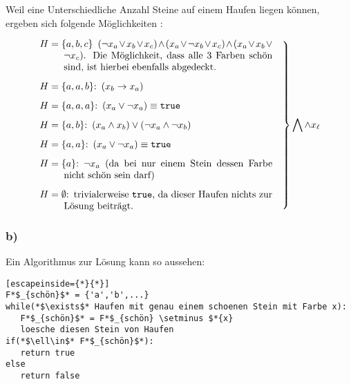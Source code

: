 \documentclass{article}
\begin{document}
Weil eine Unterschiedliche Anzahl Steine auf einem Haufen
liegen können, ergeben sich folgende Möglichkeiten :

\begin{equation*}
   \left.
   \begin{minipage}{.7\textwidth}
      \begin{itemize}[align=left]
         \item[$H=\{a,b,c\}$] $(\neg x_a \vee x_b \vee x_c) \wedge (x_a \vee \neg x_b
            \vee x_c) \wedge (x_a \vee x_b \vee \neg x_c)$. Die Möglichkeit, dass
            alle 3 Farben schön sind, ist hierbei ebenfalls abgedeckt.
         \item[$H=\{a,a,b\}$:] $(x_b \rightarrow x_a)$
         \item[$H=\{a,a,a\}$:] $(x_a \vee \neg x_a) \equiv \texttt{true}$
         \item[$H=\{a,b\}$:] $(x_a \wedge x_b) \vee (\neg x_a \wedge \neg x_b)$
         \item[$H=\{a,a\}$:] $(x_a \vee \neg x_a) \equiv \texttt{true}$
         \item[$H=\{a\}$:] $\neg x_a$ (da bei nur einem Stein dessen Farbe nicht schön
            sein darf)
         \item[$H=\emptyset$:] trivialerweise \texttt{true}, da dieser Haufen nichts
            zur Lösung beiträgt.
      \end{itemize}
   \end{minipage}\quad
\right\}\bigwedge \wedge x_{\ell}
\end{equation*}

\subsubsection{b)}

Ein Algorithmus zur Lösung kann so aussehen:

\begin{lstlisting}[escapeinside={*}{*}]
F*$_{schön}$* = {'a','b',...}
while(*$\exists$* Haufen mit genau einem schoenen Stein mit Farbe x):
   F*$_{schön}$* = F*$_{schön} \setminus $*{x}
   loesche diesen Stein von Haufen
if(*$\ell\in$* F*$_{schön}$*):
   return true
else 
   return false
\end{lstlisting}

\subsection{} 
\end{document}
